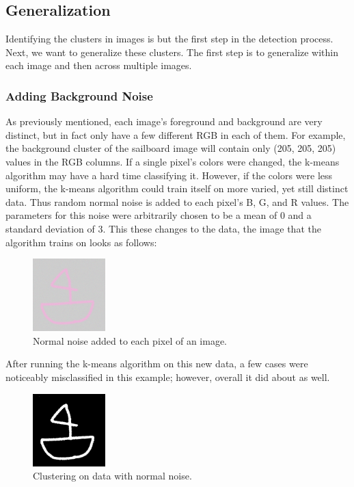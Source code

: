 \documentclass[12pt]{article}
\begin{document}
\subsection{Generalization}
Identifying the clusters in images is but the first step in the detection process. Next, we want to generalize these clusters. The first step is to generalize within each image and then across multiple images.

\subsubsection{Adding Background Noise}
As previously mentioned, each image's foreground and background are very distinct, but in fact only have a few different RGB in each of them. For example, the background cluster of the sailboard image will contain only (205, 205, 205) values in the RGB columns. If a single pixel's colors were changed, the k-means algorithm may have a hard time classifying it. However, if the colors were less uniform, the k-means algorithm could train itself on more varied, yet still distinct data. Thus random normal noise is added to each pixel's B, G, and R values. The parameters for this noise were arbitrarily chosen to be a mean of 0 and a standard deviation of 3. This these changes to the data, the image that the algorithm trains on looks as follows:

\begin{figure}[H]
\centering
\includegraphics[width=0.25\textwidth]{img/noise_data2.png}
\caption{Normal noise added to each pixel of an image.}
\label{fig:noise1}
\end{figure}

After running the k-means algorithm on this new data, a few cases were noticeably misclassified in this example; however, overall it did about as well.

\begin{figure}[H]
	\centering
	\includegraphics[width=0.25\textwidth]{img/noise_data2_bwnoise.png}
	\caption{Clustering on data with normal noise.}
	\label{fig:noise2}
\end{figure}
\end{document}
